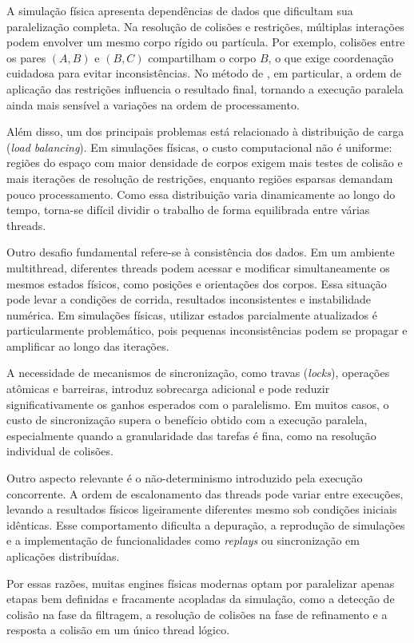 A simulação física apresenta dependências de dados que dificultam sua paralelização completa. Na resolução de colisões e restrições, múltiplas interações podem envolver um mesmo corpo rígido ou partícula. Por exemplo, colisões entre os pares $(A,B)$ e $(B,C)$ compartilham o corpo $B$, o que exige coordenação cuidadosa para evitar inconsistências. No método de , em particular, a ordem de aplicação das restrições influencia o resultado final, tornando a execução paralela ainda mais sensível a variações na ordem de processamento.

Além disso, um dos principais problemas está relacionado à distribuição de carga (\textit{load balancing}). Em simulações físicas, o custo computacional não é uniforme: regiões do espaço com maior densidade de corpos exigem mais testes de colisão e mais iterações de resolução de restrições, enquanto regiões esparsas demandam pouco processamento. Como essa distribuição varia dinamicamente ao longo do tempo, torna-se difícil dividir o trabalho de forma equilibrada entre várias threads.

Outro desafio fundamental refere-se à consistência dos dados. Em um ambiente multithread, diferentes threads podem acessar e modificar simultaneamente os mesmos estados físicos, como posições e orientações dos corpos. Essa situação pode levar a condições de corrida, resultados inconsistentes e instabilidade numérica. Em simulações físicas, utilizar estados parcialmente atualizados é particularmente problemático, pois pequenas inconsistências podem se propagar e amplificar ao longo das iterações.

A necessidade de mecanismos de sincronização, como travas (\textit{locks}), operações atômicas e barreiras, introduz sobrecarga adicional e pode reduzir significativamente os ganhos esperados com o paralelismo. Em muitos casos, o custo de sincronização supera o benefício obtido com a execução paralela, especialmente quando a granularidade das tarefas é fina, como na resolução individual de colisões.

Outro aspecto relevante é o não-determinismo introduzido pela execução concorrente. A ordem de escalonamento das threads pode variar entre execuções, levando a resultados físicos ligeiramente diferentes mesmo sob condições iniciais idênticas. Esse comportamento dificulta a depuração, a reprodução de simulações e a implementação de funcionalidades como \textit{replays} ou sincronização em aplicações distribuídas.

Por essas razões, muitas engines físicas modernas optam por paralelizar apenas etapas bem definidas e fracamente acopladas da simulação, como a detecção de colisão na fase da filtragem, a resolução de colisões na fase de refinamento e a resposta a colisão em um único thread lógico.


